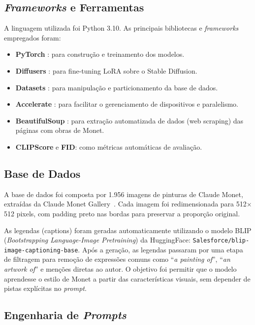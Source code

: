 \subsection{\textit{Frameworks} e Ferramentas}

A linguagem utilizada foi Python 3.10. As principais bibliotecas e \textit{frameworks} empregados foram:

\begin{itemize}
\item \textbf{PyTorch} \cite{pytorch}: para construção e treinamento dos modelos.
\item \textbf{Diffusers} \cite{diffusers}: para fine-tuning LoRA sobre o Stable Diffusion.
\item \textbf{Datasets} \cite{datasets}: para manipulação e particionamento da base de dados.
\item \textbf{Accelerate} \cite{accelerate}: para facilitar o gerenciamento de dispositivos e paralelismo.
\item \textbf{BeautifulSoup} \cite{beautifulsoup}: para extração automatizada de dados (web scraping) das páginas com obras de Monet.
\item \textbf{CLIPScore} e \textbf{FID}: como métricas automáticas de avaliação.
\end{itemize}

\subsection{Base de Dados}

A base de dados foi composta por 1.956 imagens de pinturas de Claude Monet, extraídas da Claude Monet Gallery~\cite{cmgallery}. Cada imagem foi redimensionada para 512$\times$512 pixels, com padding preto nas bordas para preservar a proporção original.

As legendas (captions) foram geradas automaticamente utilizando o modelo BLIP (\textit{Bootstrapping Language-Image Pretraining}) da HuggingFace: \texttt{Salesforce/blip-image-captioning-base}. Após a geração, as legendas passaram por uma etapa de filtragem para remoção de expressões comuns como ``\textit{a painting of}'', ``\textit{an artwork of}'' e menções diretas ao autor. O objetivo foi permitir que o modelo aprendesse o estilo de Monet a partir das características visuais, sem depender de pistas explícitas no \textit{prompt}.

\subsection{Engenharia de \textit{Prompts}}

